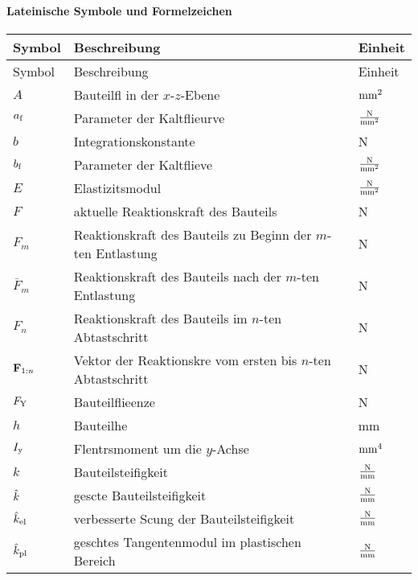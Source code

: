 \paragraph*{Lateinische Symbole und Formelzeichen}
\begin{longtable}{@{}l@{\qquad}p{}@{\quad}p{18mm}}
\toprule
Symbol & Beschreibung & Einheit\\ \midrule
\endfirsthead
\toprule
Symbol & Beschreibung & Einheit\\ \midrule
\endhead

	$A$ & Bauteilfl in der $x$-$z$-Ebene & $\mathrm{mm}^2$ \\
	$a_{\mathrm{f}}$ & Parameter der Kaltflieurve & $\frac{\mathrm{N}}{\mathrm{mm^2}}$\\
	$b$ & Integrationskonstante & N\\
	$b_{\mathrm{f}}$ & Parameter der Kaltflieve & $\frac{\mathrm{N}}{\mathrm{mm^2}}$\\
	$E$ & Elastizitsmodul & $\frac{\mathrm{N}}{\mathrm{mm^2}}$\\
	$F$ & aktuelle Reaktionskraft des Bauteils & N\\
	$F_m$ & Reaktionskraft des Bauteils zu Beginn der $m$-ten Entlastung & N\\
	$\bar{F}_m$ & Reaktionskraft des Bauteils nach der $m$-ten Entlastung & N\\
	$F_n$ & Reaktionskraft des Bauteils im $n$-ten Abtastschritt & N\\
	$\mathbf{F}_{1:n}$ & Vektor der Reaktionskre vom ersten bis $n$-ten Abtastschritt & N\\
	$F_{\mathrm{Y}}$ & Bauteilflieenze & N\\
	$h$ & Bauteilhe & mm\\
	$I_{\mathrm{y}}$ & Flentrsmoment um die $y$-Achse & $\mathrm{mm}^4$\\
	$k$ & Bauteilsteifigkeit & $\frac{\mathrm{N}}{\mathrm{mm}}$\\
	$\hat{k}$ & gescte Bauteilsteifigkeit & $\frac{\mathrm{N}}{\mathrm{mm}}$\\
	$\hat{k}_{\mathrm{el}}$ & verbesserte Scung der Bauteilsteifigkeit & $\frac{\mathrm{N}}{\mathrm{mm}}$\\
	$\hat{k}_{\mathrm{pl}}$ & geschtes Tangentenmodul im plastischen Bereich & $\frac{\mathrm{N}}{\mathrm{mm}}$\\

\end{longtable}
